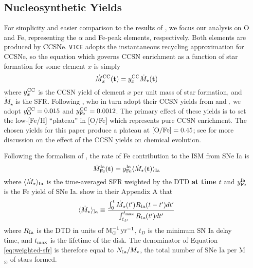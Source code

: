 \documentclass[twocolumn,twocolappendix,linenumbers]{aastex631}
\newcommand{\vice}{{\tt VICE}\xspace}
\begin{document}
\subsection{Nucleosynthetic Yields}
\label{sec:yields}

For simplicity and easier comparison to the results of , we focus our analysis on O and Fe, representing the $\alpha$ and Fe-peak elements, respectively. Both elements are produced by CCSNe. \vice adopts the instantaneous recycling approximation for CCSNe, so the equation which governs CCSN enrichment as a function of star formation for some element $x$ is simply
\begin{equation}
    \dot M_x^{\rm CC}{\bf (t)} = y_x^{\rm CC} \dot M_\star{\bf (t)}
    \label{eq:ccsn-enrichment}
\end{equation}
where $y_x^{\rm CC}$ is the CCSN yield of element $x$ per unit mass of star formation, and $\dot M_\star$ is the SFR. Following , who in turn adopt their CCSN yields from \citet{ChieffiLimongi2004-CCSNYields} and \citet{LimongiChieffi2006-CCSNYields}, we adopt $y_{\rm O}^{\rm CC}=0.015$ and $y_{\rm Fe}^{\rm CC}=0.0012$. The primary effect of these yields is to set the low-[Fe/H] ``plateau'' in [O/Fe] which represents pure CCSN enrichment. The chosen yields for this paper produce a plateau at ${\rm [O/Fe]}=0.45$; see \citet{Weinberg2023-CCSNYield} for more discussion on the effect of the CCSN yields on chemical evolution.

Following the formalism of \citet{Weinberg2017-ChemicalEquilibrium}, the rate of Fe contribution to the ISM from SNe Ia is 
\begin{equation}
    \dot M_{\rm Fe}^{\rm Ia}{\bf (t)} = y_{\rm Fe}^{\rm Ia} \langle \dot M_\star{\bf (t)}\rangle_{\rm Ia} \\
\end{equation}
where $\langle \dot M_\star\rangle_{\rm Ia}$ is the time-averaged SFR weighted by the DTD {\bf at time $t$} and $y_{\rm Fe}^{\rm Ia}$ is the Fe yield of SNe Ia. \citet{Weinberg2017-ChemicalEquilibrium} show in their Appendix A that
\begin{equation}
    \langle \dot M_\star\rangle_{\rm Ia} \equiv \frac{\int_0^t \dot M_\star(t')R_{\rm Ia}(t-t')dt'}{\int_{t_D}^{t_{\rm max}} R_{\rm Ia}(t')dt'}
    \label{eq:weighted-sfr}
\end{equation}
where $R_{\rm Ia}$ is the DTD in units of ${\rm M}_\odot^{-1}\,{\rm yr}^{-1}$, $t_D$ is the minimum SN Ia delay time, and $t_{\rm max}$ is the lifetime of the disk. The denominator of Equation \ref{eq:weighted-sfr} is therefore equal to $N_{\rm Ia}/M_\star$, the total number of SNe Ia per M$_{\odot}$ of stars formed.
\end{document}
